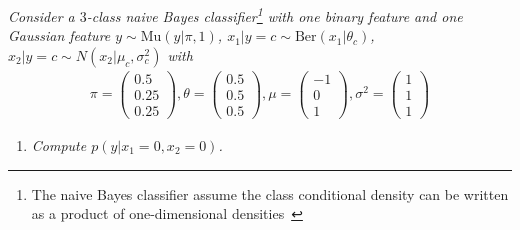 \begin{example}
	\emph{Consider a $3$-class naive Bayes classifier\footnote{The naive Bayes classifier assume the class conditional density can be written as a product of one-dimensional densities~\citep[p.84]{murphy2013machine}} with one binary feature and one Gaussian feature $y\sim \text{Mu}(y|\pi,1)$, $x_1|y=c\sim \text{Ber}(x_1|\theta_c)$, $x_2|y=c\sim N(x_2|\mu_c,\sigma_c^2)$ with}
	\begin{equation}
		\begin{split}
			\pi = \begin{pmatrix}
				0.5 \\
				0.25 \\
				0.25
			\end{pmatrix}, 
			\theta = \begin{pmatrix}
				0.5 \\
				0.5 \\
				0.5
			\end{pmatrix}, 
			\mu = \begin{pmatrix}
				-1 \\
				0 \\
				1
			\end{pmatrix},
			\sigma^2 = \begin{pmatrix}
				1 \\
				1 \\
				1
			\end{pmatrix}
		\end{split}
	\end{equation}
	
	\begin{enumerate}
		\item \emph{Compute $p(y|x_1=0,x_2=0)$.}
		

\end{enumerate}
\end{example}
